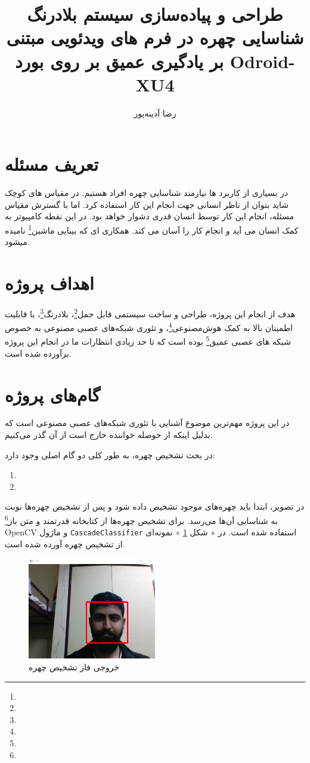 \documentclass[12pt]{article}
\title{\textbf{طراحی و پیاده‌سازی سیستم بلادرنگ شناسایی چهره در فرم های ویدئویی مبتنی بر یادگیری عمیق بر روی بورد Odroid-XU4}}
\author{رضا آدینه‌پور}
\begin{document}
\maketitle

\section{تعریف مسئله}
در بسیاری از کاربرد ها نیازمند شناسایی چهره افراد هستیم. در مقیاس های کوچک شاید بتوان از ناظر انسانی جهت انجام این کار استفاده کرد. اما با گسترش مقیاس مسئله، انجام این کار توسط انسان قدری دشوار خواهد بود. در این نقطه کامپیوتر به کمک انسان می آید و انجام کار را آسان می کند. همکاری ای که بینایی ماشین\footnote{} نامیده میشود.

\section{اهداف پروژه}
هدف از انجام این پروژه، طراحی و ساخت سیستمی قابل حمل\footnote{}، بلادرنگ\footnote{}، با قابلیت اطمینان بالا به کمک هوش‌مصنوعی\footnote{}، و تئوری شبکه‌های عصبی مصنوعی به خصوص شبکه های عصبی عمیق\footnote{} بوده است که تا حد زیادی انتظارات ما در انجام این پروژه برآورده شده است.

\section{گام‌های پروژه}
در این پروژه مهم‌ترین موضوع آشنایی با تئوری شبکه‌های عصبی مصنوعی است که بدلیل اینکه از حوصله خواننده خارج است از آن گذر می‌کنیم.

در بحث تشخیص چهره، به طور کلی دو گام اصلی وجود دارد:
\begin{enumerate}
	\item {}
	\item {}
\end{enumerate}

در تصویر، ابتدا باید چهره‌های موجود تشخیص داده شود و پس از تشخیص چهره‌ها نوبت به شناسایی آن‌ها می‌رسد. برای تشخیص چهره‌ها از کتابخانه قدرتمند و متن باز\footnote{} OpenCV و ماژول \texttt{CascadeClassifier} استفاده شده است. در « شکل \ref{تشخیص‌چهره} » نمونه‌ای از تشخیص چهره آورده شده است.
\begin{figure}[h]
	\centering
	\includegraphics[width=0.5\textwidth]{images/face_detect}
	\caption{خروجی فاز تشخیص چهره}
	\label{تشخیص‌چهره}
\end{figure}
\end{document}
